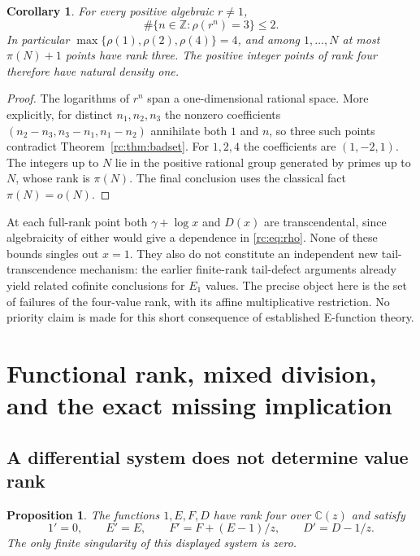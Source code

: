 \documentclass[11pt,a4paper]{article}
\newtheorem{proposition}[theorem]{Proposition}
\newtheorem{corollary}[theorem]{Corollary}
\theoremstyle{definition}
\theoremstyle{remark}
\theoremstyle{plain}
\numberwithin{equation}{section}
\providecommand{\rcC}{\mathbb C}
\providecommand{\rcZ}{\mathbb Z}
\begin{document}
\begin{corollary}\label{rc:cor:geometric}
For every positive algebraic $r\ne1$,
\[
 \#\{n\in\rcZ:\rho(r^n)=3\}\le2.
\]
In particular $\max\{\rho(1),\rho(2),\rho(4)\}=4$, and among
$1,\ldots,N$ at most $\pi(N)+1$ points have rank three.  The positive
integer points of rank four therefore have natural density one.
\end{corollary}

\begin{proof}
The logarithms of $r^n$ span a one-dimensional rational space.  More
explicitly, for distinct $n_1,n_2,n_3$ the nonzero coefficients
$(n_2-n_3,n_3-n_1,n_1-n_2)$ annihilate both $1$ and $n$, so three such
points contradict Theorem~\ref{rc:thm:badset}.  For $1,2,4$ the coefficients
are $(1,-2,1)$.  The integers up to $N$ lie in the positive rational
group generated by primes up to $N$, whose rank is $\pi(N)$.
The final conclusion uses the classical fact $\pi(N)=o(N)$.
\end{proof}

At each full-rank point both $\gamma+\log x$ and $D(x)$ are
transcendental, since algebraicity of either would give a dependence in
\eqref{rc:eq:rho}.  None of these bounds singles out $x=1$.  They also
do not constitute an independent new tail-transcendence mechanism:
the earlier finite-rank tail-defect arguments already yield related
cofinite conclusions for $E_1$ values.  The precise object here is the
set of failures of the four-value rank, with its affine multiplicative
restriction.  No priority claim is made for this short consequence of
established E-function theory.

\section{Functional rank, mixed division, and the exact missing implication}
\label{rc:sec:mixed}

\subsection{A differential system does not determine value rank}

\begin{proposition}\label{rc:prop:functionalrank}
The functions $1,E,F,D$ have rank four over $\rcC(z)$ and satisfy
\begin{equation}\label{rc:eq:four-system}
 1'=0,\qquad E'=E,\qquad
 F'=F+(E-1)/z,\qquad D'=D-1/z.
\end{equation}
The only finite singularity of this displayed system is zero.
\end{proposition}
\end{document}
